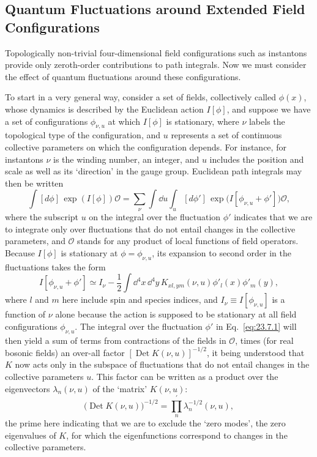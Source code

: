 \subsection{Quantum Fluctuations around Extended Field Configurations}
\label{sec:23.7}

Topologically non-trivial four-dimensional field configurations such as
instantons provide only zeroth-order contributions to path integrals.
Now we must consider the effect of quantum fluctuations around these
configurations.

To start in a very general way, consider a set of fields, collectively
called $\phi(x)$, whose dynamics is described by the Euclidean action
$I[\phi]$, and suppose we have a set of configurations $\phi_{\nu,u}$ at
which $I[\phi]$ is stationary, where $\nu$ labels the topological type of
the configuration, and $u$ represents a set of continuous collective
parameters on which the configuration depends. For instance, for
instantons $\nu$ is the winding number, an integer, and $u$ includes the
position and scale as well as its `direction' in the gauge group.
Euclidean path integrals may then be written
\begin{equation}
\int[d\phi]\,\exp(I[\phi])\mathcal O
=\sum_\nu\int \dd u\int_u[d\phi']\,
\exp\bigl(I[\phi_{\nu,u}+\phi']\bigr)\mathcal O,
\tag{23.7.1}\label{eq:23.7.1}
\end{equation}
where the subscript $u$ on the integral over the fluctuation $\phi'$
indicates that we are to integrate only over fluctuations that do not
entail changes in the collective parameters, and $\mathcal O$ stands for
any product of local functions of field operators. Because $I[\phi]$ is
stationary at $\phi=\phi_{\nu,u}$, its expansion to second order in the
fluctuations takes the form
\begin{equation}
I[\phi_{\nu,u}+\phi']\simeq I_\nu
-\frac12\int \dd^4x\,\dd^4y\,
K_{xl,ym}(\nu,u)\phi'_l(x)\phi'_m(y),
\tag{23.7.2}\label{eq:23.7.2}
\end{equation}
where $l$ and $m$ here include spin and species indices, and
$I_\nu\equiv I[\phi_{\nu,u}]$ is a function of $\nu$ alone because the action
is supposed to be stationary at all field configurations
$\phi_{\nu,u}$. The integral over the fluctuation $\phi'$ in
Eq.~\eqref{eq:23.7.1} will then yield a sum of terms from contractions
of the fields in $\mathcal O$, times (for real bosonic fields) an
over-all factor $[\operatorname{Det}K(\nu,u)]^{-1/2}$, it being
understood that $K$ now acts only in the subspace of fluctuations that
do not entail changes in the collective parameters $u$. This factor can
be written as a product over the eigenvectors $\lambda_n(\nu,u)$ of the
`matrix' $K(\nu,u)$:
\begin{equation}
\bigl(\operatorname{Det}K(\nu,u)\bigr)^{-1/2}
=\prod_n^{\prime}\lambda_n^{-1/2}(\nu,u),
\tag{23.7.3}\label{eq:23.7.3}
\end{equation}
the prime here indicating that we are to exclude the `zero modes', the
zero eigenvalues of $K$, for which the eigenfunctions correspond to
changes in the collective parameters.

